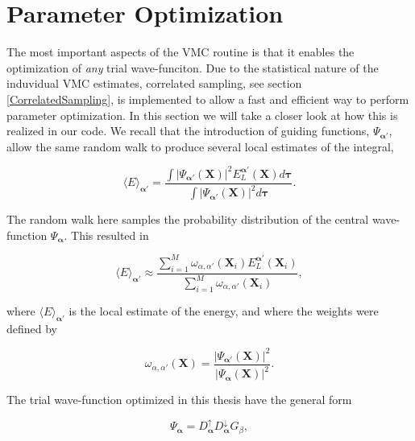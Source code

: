 \section{Parameter Optimization}
\label{ParameterOptimization}

The most important aspects of the VMC routine is that it enables the
optimization of \emph{any} trial wave-funciton. Due to the
statistical nature of the induvidual VMC estimates, 
correlated sampling, see section \ref{CorrelatedSampling}, is
implemented to allow a fast and efficient way to perform parameter
optimization. In this section we will take a closer look at how this
is realized in our code.
\newline
%
\newline
We recall that the introduction of guiding functions,
$\Psi_{\mathbf{\alpha'}}$, allow the same random walk to produce several 
local estimates of the integral,


\begin{equation*}
  \langle E \rangle_{\mathbf{\alpha'}} 
  = \frac  {\int|\Psi_{\mathbf{\alpha'}}(\mathbf{X})|^2
  E_L^{\mathbf{\alpha'}} (\mathbf{X})d\mathbf{\tau}} 
  {\int|\Psi_{\mathbf{\alpha'}} (\mathbf{X})|^2d\mathbf{\tau} }.
\end{equation*}

The random walk here samples the probability distribution of the
central wave-function $\Psi_{\mathbf{\alpha}}$. This resulted in 

\begin{equation*}
  \langle E \rangle_{\mathbf{\alpha'}} 
  \approx \frac  {
    \sum\limits_{i=1}^{M} \omega_{\alpha,\alpha'}(\mathbf{X}_i)
    E_L^{\mathbf{\alpha'}} (\mathbf{X}_i)
  } 
  {
    \sum\limits_{i=1}^{M} \omega_{\alpha,\alpha'}(\mathbf{X}_i)
  },
\end{equation*}

where $\langle E \rangle_{\mathbf{\alpha'}}$ is the local estimate of
the energy, and where the weights were defined by

\begin{equation*}
  \omega_{\alpha,\alpha'}(\mathbf{X}) =
  \frac{|\Psi_{\mathbf{\alpha'}}(\mathbf{X})|^2}
       {|\Psi_{\mathbf{\alpha}}(\mathbf{X})|^2}.
\end{equation*}

The trial wave-function optimized in this thesis have the general form

\begin{equation*}
  \Psi_{\mathbf{\alpha}} = D_{\mathbf{\alpha}}^{\uparrow}
  D_{\mathbf{\alpha}}^{\downarrow} G_{\beta},
\end{equation*}

